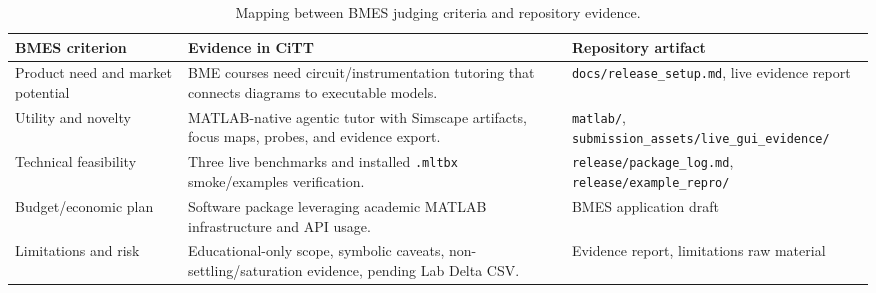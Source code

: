 \begin{table}[t]
\centering
\small
\begin{tabular}{p{}p{}p{}}
\toprule
BMES criterion & Evidence in CiTT & Repository artifact \\
\midrule
Product need and market potential & BME courses need circuit/instrumentation tutoring that connects diagrams to executable models. & \texttt{docs/release\_setup.md}, live evidence report \\
Utility and novelty & MATLAB-native agentic tutor with Simscape artifacts, focus maps, probes, and evidence export. & \texttt{matlab/}, \texttt{submission\_assets/live\_gui\_evidence/} \\
Technical feasibility & Three live benchmarks and installed \texttt{.mltbx} smoke/examples verification. & \texttt{release/package\_log.md}, \texttt{release/example\_repro/} \\
Budget/economic plan & Software package leveraging academic MATLAB infrastructure and API usage. & BMES application draft \\
Limitations and risk & Educational-only scope, symbolic caveats, non-settling/saturation evidence, pending Lab Delta CSV. & Evidence report, limitations raw material \\
\bottomrule
\end{tabular}
\caption{Mapping between BMES judging criteria and repository evidence.}
\label{tab:bmes_mapping}
\end{table}
